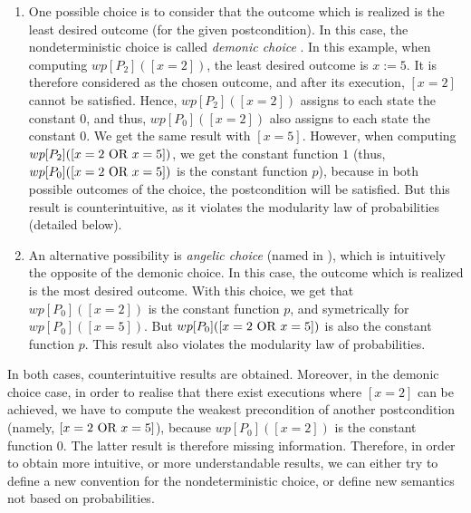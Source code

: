 \documentclass[a4paper,10pt]{llncs}
\begin{document}
\begin{enumerate}
\item One possible choice is to consider that the outcome which is realized is the least desired outcome (for the given postcondition). In this case, the nondeterministic choice is called \emph{demonic choice} \cite{McIver05}. In this example, when computing $wp[P_2]([x = 2])$, the least desired outcome is $x := 5$. It is therefore considered as the chosen outcome, and after its execution, $[x = 2]$ cannot be satisfied. Hence, $wp[P_2]([x = 2])$ assigns to each state the constant $0$, and thus, $wp[P_0]([x = 2])$ also assigns to each state the constant $0$. We get the same result with $[x = 5]$. However, when computing $wp[P_2]([x = 2 \textnormal{ OR } x = 5])$, we get the constant function $1$ (thus, $wp[P_0]([x = 2 \textnormal{ OR } x = 5])$ is the constant function $p$), because in both possible outcomes of the choice, the postcondition will be satisfied. But this result is counterintuitive, as it violates the modularity law of probabilities (detailed below).
\item An alternative possibility is \emph{angelic choice} (named in \cite{McIver05}), which is intuitively the opposite of the demonic choice. In this case, the outcome which is realized is the most desired outcome. With this choice, we get that $wp[P_0]([x = 2])$ is the constant function $p$, and symetrically for $wp[P_0]([x = 5])$. But $wp[P_0]([x = 2 \textnormal{ OR } x = 5])$ is also the constant function $p$. This result also violates the modularity law of probabilities.
\end{enumerate}
In both cases, counterintuitive results are obtained.
Moreover, in the demonic choice case, in order to realise that there exist executions where $[x=2]$ can be achieved, we have to compute the weakest precondition of another postcondition (namely, $[x = 2 \textnormal{ OR } x = 5]$), because $wp[P_0]([x = 2])$ is the constant function $0$. The latter result is therefore missing information. Therefore, in order to obtain more intuitive, or more understandable results, we can either try to define a new convention for the nondeterministic choice, or define new semantics not based on probabilities.\bigskip
\end{document}
